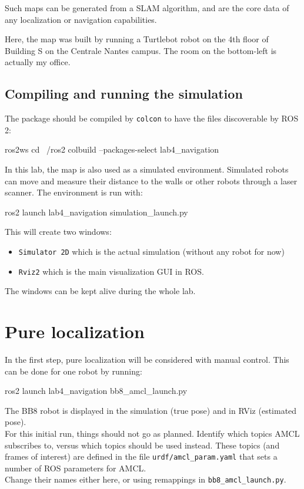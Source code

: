 \documentclass{ecnreport}
\begin{document}
Such maps can be generated from a SLAM algorithm, and are the core data of any localization or navigation capabilities.

Here, the map was built by running a Turtlebot robot on the 4th floor of Building S on the Centrale Nantes campus. The room on the bottom-left is actually my office.


\subsection{Compiling and running the simulation}

The package should be compiled by \texttt{colcon} to have the files discoverable by ROS 2:
\begin{bashcodelarge}
 ros2ws
 cd ~/ros2
 colbuild --packages-select lab4_navigation
\end{bashcodelarge}

In this lab, the map is also used as a simulated environment. Simulated robots can move and measure their distance to the walls or other robots through a laser scanner. The environment is run with:
\begin{bashcodelarge}
 ros2 launch lab4_navigation simulation_launch.py 
\end{bashcodelarge}This will create two windows:
\begin{itemize}
 \item \texttt{Simulator 2D} which is the actual simulation (without any robot for now)
 \item \texttt{Rviz2} which is the main visualization GUI in ROS.
\end{itemize}
The windows can be kept alive during the whole lab.

\newpage

\section{Pure localization}

In the first step, pure localization will be considered with manual control. This can be done for one robot by running:
\begin{bashcodelarge}
 ros2 launch lab4_navigation bb8_amcl_launch.py
\end{bashcodelarge}
The BB8 robot is displayed in the simulation (true pose) and in RViz (estimated pose).\\

For this initial run, things should not go as planned. Identify which topics AMCL subscribes to, versus which topics should be used instead. These topics (and frames of interest) are defined in the file \texttt{urdf/amcl\_param.yaml} that sets a number of ROS parameters for AMCL. \\Change their names either here, or using remappings in \texttt{bb8\_amcl\_launch.py}. 
\end{document}
